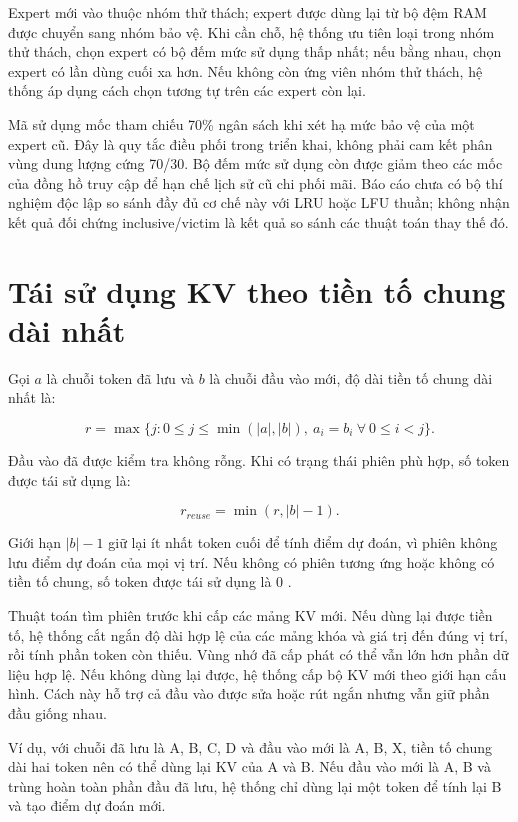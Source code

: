 Expert mới vào thuộc nhóm thử thách; expert được dùng lại từ bộ đệm RAM được chuyển sang nhóm bảo vệ. Khi cần chỗ, hệ thống ưu tiên loại trong nhóm thử thách, chọn expert có bộ đếm mức sử dụng thấp nhất; nếu bằng nhau, chọn expert có lần dùng cuối xa hơn. Nếu không còn ứng viên nhóm thử thách, hệ thống áp dụng cách chọn tương tự trên các expert còn lại.

Mã sử dụng mốc tham chiếu 70\% ngân sách khi xét hạ mức bảo vệ của một expert cũ. Đây là quy tắc điều phối trong triển khai, không phải cam kết phân vùng dung lượng cứng 70/30. Bộ đếm mức sử dụng còn được giảm theo các mốc của đồng hồ truy cập để hạn chế lịch sử cũ chi phối mãi. Báo cáo chưa có bộ thí nghiệm độc lập so sánh đầy đủ cơ chế này với LRU hoặc LFU thuần; không nhận kết quả đối chứng inclusive/victim là kết quả so sánh các thuật toán thay thế đó.

\section{Tái sử dụng KV theo tiền tố chung dài nhất}

Gọi $a$ là chuỗi token đã lưu và $b$ là chuỗi đầu vào mới, độ dài tiền tố chung dài nhất là:

\begin{equation}
\label{eq:4.1}
r=\max\{j:0\leq j\leq\min(|a|,|b|),\ a_i=b_i\ \forall\ 0\leq i<j\}.
\end{equation}

Đầu vào đã được kiểm tra không rỗng. Khi có trạng thái phiên phù hợp, số token được tái sử dụng là:

\begin{equation}
\label{eq:4.2}
r_{reuse}=\min(r,|b|-1).
\end{equation}

Giới hạn $|b|-1$ giữ lại ít nhất token cuối để tính điểm dự đoán, vì phiên không lưu điểm dự đoán của mọi vị trí. Nếu không có phiên tương ứng hoặc không có tiền tố chung, số token được tái sử dụng là 0 \cite{moe_tierengine_arch}.

Thuật toán tìm phiên trước khi cấp các mảng KV mới. Nếu dùng lại được tiền tố, hệ thống cắt ngắn độ dài hợp lệ của các mảng khóa và giá trị đến đúng vị trí, rồi tính phần token còn thiếu. Vùng nhớ đã cấp phát có thể vẫn lớn hơn phần dữ liệu hợp lệ. Nếu không dùng lại được, hệ thống cấp bộ KV mới theo giới hạn cấu hình. Cách này hỗ trợ cả đầu vào được sửa hoặc rút ngắn nhưng vẫn giữ phần đầu giống nhau.

Ví dụ, với chuỗi đã lưu là A, B, C, D và đầu vào mới là A, B, X, tiền tố chung dài hai token nên có thể dùng lại KV của A và B. Nếu đầu vào mới là A, B và trùng hoàn toàn phần đầu đã lưu, hệ thống chỉ dùng lại một token để tính lại B và tạo điểm dự đoán mới.

